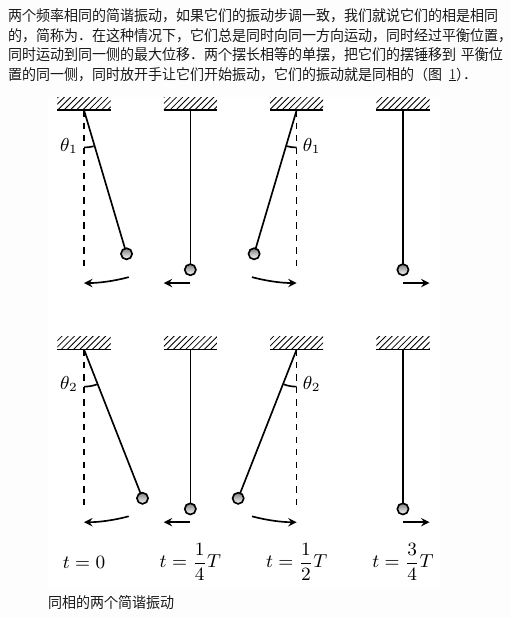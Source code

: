 两个频率相同的简谐振动，如果它们的振动步调一致，我们就说它们的相是相同的，简称为．在这种情况下，它们总是同时向同一方向运动，同时经过平衡位置，同时运动到同一侧的最大位移．两个摆长相等的单摆，把它们的摆锤移到
平衡位置的同一侧，同时放开手让它们开始振动，它们的振动就是同相的（图~\ref{fig_A_9-4}）．
\begin{figure}[htbp]
    \centering
    \includegraphics{fig/A/9-4.pdf}
    \caption{同相的两个简谐振动}\label{fig_A_9-4}
\end{figure}


